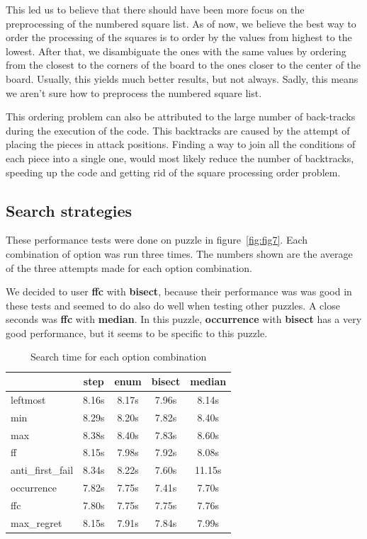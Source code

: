 \documentclass[runningheads]{llncs}
\begin{document}
This led us to believe that there should have been more focus on the preprocessing
of the numbered square list. As of now, we believe the best way to order the
processing of the squares is to order by the values from highest to the lowest.
After that, we disambiguate the ones with the same values by ordering
from the closest to the corners of the board to the ones closer to the center of
the board. Usually, this yields much better results, but not always. Sadly,
this means we aren't sure how to preprocess the numbered square list.

This ordering problem can also be attributed to the large number of back-tracks
during the execution of the code. This backtracks are caused by the attempt
of placing the pieces in attack positions. Finding a way to join all the conditions
of each piece into a single one, would most likely reduce the number of backtracks,
speeding up the code and getting rid of the square processing order problem.

\subsection{Search strategies}
These performance tests were done on puzzle in figure~\ref{fig:fig7}. Each combination
of option was run three times. The numbers shown are the average of the three
attempts made for each option combination.

We decided to user \textbf{ffc} with \textbf{bisect}, because their performance
was was good in these tests and seemed to do also do well when testing other
puzzles. A close seconds was \textbf{ffc} with \textbf{median}. In this puzzle,
\textbf{occurrence} with \textbf{bisect} has a very good performance, but it
seems to be specific to this puzzle.

\begin{table}[H]
  \begin{center}
    \caption{Search time for each option combination}
    \label{tab:table1}
    \begin{tabular}{l|c|c|c|c}
          & step & enum & bisect & median\\
      \hline
        leftmost        & 8.16s & 8.17s & 7.96s  & 8.14s  \\
      \hline
        min             & 8.29s & 8.20s & 7.82s  & 8.40s  \\
      \hline
        max             & 8.38s & 8.40s & 7.83s  & 8.60s  \\
      \hline
        ff              & 8.15s & 7.98s & 7.92s  & 8.08s  \\
      \hline
        anti\_first\_fail & 8.34s & 8.22s & 7.60s  & 11.15s \\
      \hline
        occurrence      & 7.82s & 7.75s & 7.41s  & 7.70s  \\
      \hline
        ffc             & 7.80s & 7.75s & 7.75s  & 7.76s  \\
      \hline
        max\_regret      & 8.15s & 7.91s & 7.84s  & 7.99s  \\
    \end{tabular}
  \end{center}
\end{table}
\end{document}
